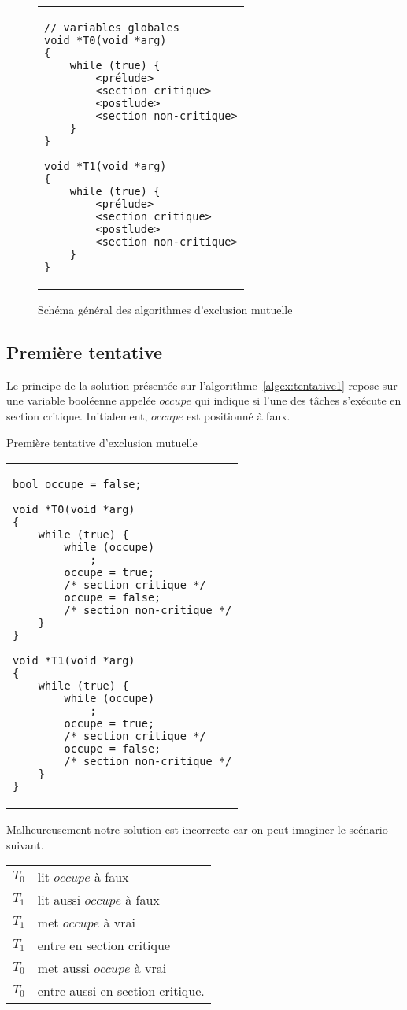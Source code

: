 \begin{figure}[!ht]

\centering
\begin{tabular}{l}
\lstset{language=C++}
\begin{lstlisting}
// variables globales
void *T0(void *arg)
{
	while (true) {
		<prélude>
		<section critique>
		<postlude>
		<section non-critique>
	}
}

void *T1(void *arg)
{
	while (true) {
		<prélude>
		<section critique>
		<postlude>
		<section non-critique>
	}
}
\end{lstlisting}
\end{tabular}
\caption{\label{algex:générale}Schéma général des algorithmes d'exclusion mutuelle}

\end{figure}

\subsection*{Première tentative}
Le principe de la solution présentée sur l'algorithme~\ref{algex:tentative1} repose sur une variable booléenne appelée $occupe$ qui indique si l'une des tâches s'exécute en section critique.
Initialement, $occupe$ est positionné à faux.

\begin{algorithm}[!ht]
\caption{Première tentative d'exclusion mutuelle}\label{algex:tentative1}
\centering
\begin{tabular}{l}
\lstset{language=C++}
\begin{lstlisting}
bool occupe = false;

void *T0(void *arg)
{
	while (true) {
		while (occupe)
			;
		occupe = true;
		/* section critique */
		occupe = false;
		/* section non-critique */
	}
}

void *T1(void *arg)
{
	while (true) {
		while (occupe)
			;
		occupe = true;
		/* section critique */
		occupe = false;
		/* section non-critique */
	}
}
\end{lstlisting}
\end{tabular}

\end{algorithm}

Malheureusement notre solution est incorrecte car on peut imaginer le scénario suivant.
\centering
\begin{tabular}{cl}
$T_0$& lit $occupe$ à faux \\
$T_1$& lit aussi $occupe$ à faux \\
$T_1$& met $occupe$ à vrai \\
$T_1$& entre en section critique \\
$T_0$& met aussi $occupe$ à vrai \\
$T_0$& entre aussi en section critique. \\
\end{tabular}

